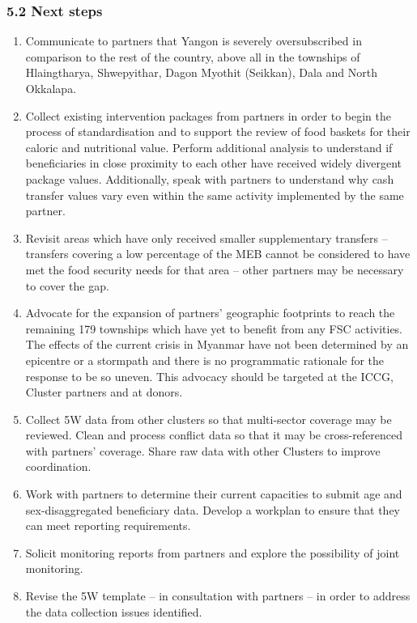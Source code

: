 \documentclass[
]{article}
\begin{document}
\hypertarget{next-steps}{%
\subsubsection{5.2 Next steps}\label{next-steps}}

\begin{enumerate}
\def\labelenumi{\arabic{enumi}.}
\item
  Communicate to partners that Yangon is severely oversubscribed in
  comparison to the rest of the country, above all in the townships of
  Hlaingtharya, Shwepyithar, Dagon Myothit (Seikkan), Dala and North
  Okkalapa.
\item
  Collect existing intervention packages from partners in order to begin
  the process of standardisation and to support the review of food
  baskets for their caloric and nutritional value. Perform additional
  analysis to understand if beneficiaries in close proximity to each
  other have received widely divergent package values. Additionally,
  speak with partners to understand why cash transfer values vary even
  within the same activity implemented by the same partner.
\item
  Revisit areas which have only received smaller supplementary transfers
  -- transfers covering a low percentage of the MEB cannot be considered
  to have met the food security needs for that area -- other partners
  may be necessary to cover the gap.
\item
  Advocate for the expansion of partners' geographic footprints to reach
  the remaining 179 townships which have yet to benefit from any FSC
  activities. The effects of the current crisis in Myanmar have not been
  determined by an epicentre or a stormpath and there is no programmatic
  rationale for the response to be so uneven. This advocacy should be
  targeted at the ICCG, Cluster partners and at donors.
\item
  Collect 5W data from other clusters so that multi-sector coverage may
  be reviewed. Clean and process conflict data so that it may be
  cross-referenced with partners' coverage. Share raw data with other
  Clusters to improve coordination.
\item
  Work with partners to determine their current capacities to submit age
  and sex-disaggregated beneficiary data. Develop a workplan to ensure
  that they can meet reporting requirements.
\item
  Solicit monitoring reports from partners and explore the possibility
  of joint monitoring.
\item
  Revise the 5W template -- in consultation with partners -- in order to
  address the data collection issues identified.
\end{enumerate}
\end{document}
